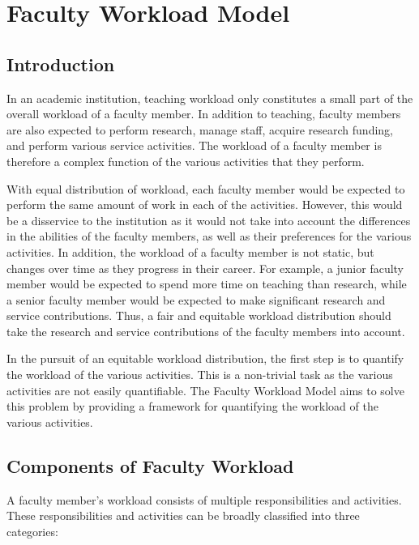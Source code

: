\chapter{Faculty Workload Model}

\section{Introduction}

In an academic institution, teaching workload only constitutes a small part of the overall workload of a faculty member. In addition to teaching, faculty members are also expected to perform research, manage staff, acquire research funding, and perform various service activities. The workload of a faculty member is therefore a complex function of the various activities that they perform.

With equal distribution of workload, each faculty member would be expected to perform the same amount of work in each of the activities. However, this would be a disservice to the institution as it would not take into account the differences in the abilities of the faculty members, as well as their preferences for the various activities. In addition, the workload of a faculty member is not static, but changes over time as they progress in their career. For example, a junior faculty member would be expected to spend more time on teaching than research, while a senior faculty member would be expected to make significant research and service contributions. Thus, a fair and equitable workload distribution should take the research and service contributions of the faculty members into account.

In the pursuit of an equitable workload distribution, the first step is to quantify the workload of the various activities. This is a non-trivial task as the various activities are not easily quantifiable. The Faculty Workload Model aims to solve this problem by providing a framework for quantifying the workload of the various activities.

\section{Components of Faculty Workload}

A faculty member's workload consists of multiple responsibilities and activities. These responsibilities and activities can be broadly classified into three categories:

